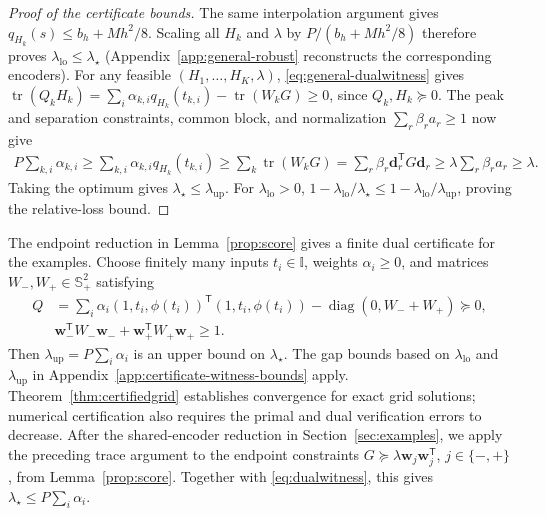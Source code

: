 \documentclass[journal,12pt,onecolumn,draftclsnofoot]{IEEEtran}
\newcommand{\T}{\mathsf T}\newcommand{\suc}{\succeq}
\begin{document}
\begin{proof}[Proof of the certificate bounds]

The same interpolation argument gives $q_{H_k}(s)\le b_h+Mh^2/8$.
Scaling all $H_k$ and $\lambda$ by $P/(b_h+Mh^2/8)$ therefore
proves $\lambda_{\mathrm{lo}}\le\lambda_\star$
(Appendix~\ref{app:general-robust} reconstructs the corresponding encoders).  For any feasible $(H_1,\ldots,H_K,\lambda)$, \eqref{eq:general-dualwitness} gives
$\operatorname{tr}(Q_kH_k)
=\sum_i\alpha_{k,i}q_{H_k}(t_{k,i})-\operatorname{tr}(W_kG)\ge0$,
since $Q_k,H_k\succeq0$.
The peak and separation constraints, common block, and normalization
$\sum_r\beta_ra_r\ge1$ now give
\begin{align}
P\sum_{k,i}\alpha_{k,i}
\ge\sum_{k,i}\alpha_{k,i}q_{H_k}(t_{k,i})\ge\sum_k\operatorname{tr}(W_kG)
 =\sum_r\beta_r\boldsymbol d_r^\T G\boldsymbol d_r\ge\lambda\sum_r\beta_r a_r\ge\lambda.
\end{align}
Taking the optimum gives $\lambda_\star\le\lambda_{\mathrm{up}}$.
For $\lambda_{\mathrm{lo}}>0$,
$1-\lambda_{\mathrm{lo}}/\lambda_\star
\le1-\lambda_{\mathrm{lo}}/\lambda_{\mathrm{up}}$,
proving the relative-loss bound.

\end{proof}


The endpoint reduction in Lemma~\ref{prop:score} gives a finite
dual certificate for the examples. Choose finitely many inputs
$t_i\in\mathbb I$, weights $\alpha_i\ge0$, and matrices
$W_-,W_+\in\mathbb S_+^2$ satisfying
\begin{equation}
\begin{aligned}
Q&=\sum_i\alpha_i(1,t_i,\phi(t_i))^\T(1,t_i,\phi(t_i))
-\operatorname{diag}(0,W_-+W_+)\succeq0,\\
&\boldsymbol w_-^\T W_-\boldsymbol w_-
+\boldsymbol w_+^\T W_+\boldsymbol w_+\ge1.
\end{aligned}
\label{eq:dualwitness}
\end{equation}
Then $\lambda_{\mathrm{up}}=P\sum_i\alpha_i$ is an upper bound on $\lambda_\star$.
The gap bounds based on $\lambda_{\mathrm{lo}}$ and $\lambda_{\mathrm{up}}$ in Appendix~\ref{app:certificate-witness-bounds} apply.
Theorem~\ref{thm:certifiedgrid} establishes convergence for
exact grid solutions; numerical certification also requires
the primal and dual verification errors to decrease. 
After the shared-encoder reduction in
Section~\ref{sec:examples}, we apply the
preceding trace argument to the endpoint constraints
$G\succeq\lambda\boldsymbol w_j\boldsymbol w_j^\T$,
$j\in\{-,+\}$, from Lemma~\ref{prop:score}.
Together with \eqref{eq:dualwitness}, this gives
$\lambda_\star\le P\sum_i\alpha_i$.
\end{document}
